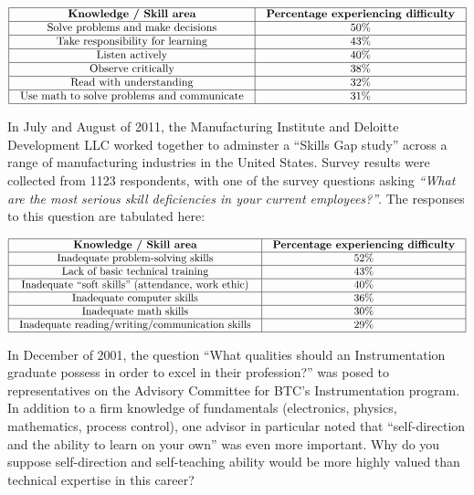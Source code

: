 $$\vbox{\offinterlineskip
\halign{\strut
\vrule \quad\hfil # \ \hfil & 
\vrule \quad\hfil # \ \hfil \vrule \cr
\noalign{\hrule}
%
{\bf Knowledge / Skill area} & {\bf Percentage experiencing difficulty} \cr
%
\noalign{\hrule}
%
Solve problems and make decisions & 50\% \cr
%
\noalign{\hrule}
%
Take responsibility for learning & 43\% \cr
%
\noalign{\hrule}
%
Listen actively & 40\% \cr
%
\noalign{\hrule}
%
Observe critically & 38\% \cr
%
\noalign{\hrule}
%
Read with understanding & 32\% \cr
%
\noalign{\hrule}
%
Use math to solve problems and communicate & 31\% \cr
%
\noalign{\hrule}
} %
}$$ %

\vskip 10pt

\filbreak

In July and August of 2011, the Manufacturing Institute and Deloitte Development LLC worked together to adminster a ``Skills Gap study'' across a range of manufacturing industries in the United States.  Survey results were collected from 1123 respondents, with one of the survey questions asking {\it ``What are the most serious skill deficiencies in your current employees?''}.  The responses to this question are tabulated here:


$$\vbox{\offinterlineskip
\halign{\strut
\vrule \quad\hfil # \ \hfil & 
\vrule \quad\hfil # \ \hfil \vrule \cr
\noalign{\hrule}
%
{\bf Knowledge / Skill area} & {\bf Percentage experiencing difficulty} \cr
%
\noalign{\hrule}
%
Inadequate problem-solving skills & 52\% \cr
%
\noalign{\hrule}
%
Lack of basic technical training & 43\% \cr
%
\noalign{\hrule}
%
Inadequate ``soft skills'' (attendance, work ethic) & 40\% \cr
%
\noalign{\hrule}
%
Inadequate computer skills & 36\% \cr
%
\noalign{\hrule}
%
Inadequate math skills & 30\% \cr
%
\noalign{\hrule}
%
Inadequate reading/writing/communication skills & 29\% \cr
%
\noalign{\hrule}
} %
}$$ %

\vskip 10pt

In December of 2001, the question ``What qualities should an Instrumentation graduate possess in order to excel in their profession?'' was posed to representatives on the Advisory Committee for BTC's Instrumentation program.  In addition to a firm knowledge of fundamentals (electronics, physics, mathematics, process control), one advisor in particular noted that ``self-direction and the ability to learn on your own'' was even more important.  Why do you suppose self-direction and self-teaching ability would be more highly valued than technical expertise in this career?


